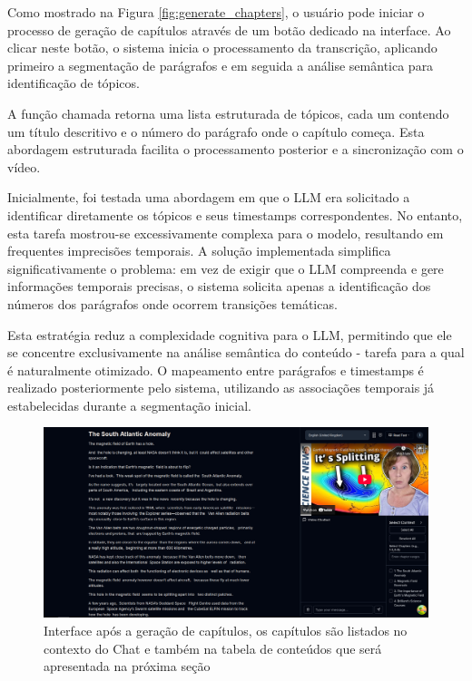 \documentclass[tcc,capa]{texufpel}
\begin{document}
Como mostrado na Figura \ref{fig:generate_chapters}, o usuário pode iniciar o processo de geração de capítulos através de um botão dedicado na interface. Ao clicar neste botão, o sistema inicia o processamento da transcrição, aplicando primeiro a segmentação de parágrafos e em seguida a análise semântica para identificação de tópicos.

A função chamada retorna uma lista estruturada de tópicos, cada um contendo um título descritivo e o número do parágrafo onde o capítulo começa. Esta abordagem estruturada facilita o processamento posterior e a sincronização com o vídeo.

Inicialmente, foi testada uma abordagem em que o LLM era solicitado a identificar diretamente os tópicos e seus timestamps correspondentes. No entanto, esta tarefa mostrou-se excessivamente complexa para o modelo, resultando em frequentes imprecisões temporais. A solução implementada simplifica significativamente o problema: em vez de exigir que o LLM compreenda e gere informações temporais precisas, o sistema solicita apenas a identificação dos números dos parágrafos onde ocorrem transições temáticas.

Esta estratégia reduz a complexidade cognitiva para o LLM, permitindo que ele se concentre exclusivamente na análise semântica do conteúdo - tarefa para a qual é naturalmente otimizado. O mapeamento entre parágrafos e timestamps é realizado posteriormente pelo sistema, utilizando as associações temporais já estabelecidas durante a segmentação inicial. 

\begin{figure}[H]
  \centering
  \includegraphics[width=\textwidth,height=0.45\textheight,keepaspectratio]{exemplo-slides/graphics/images/after-chapter-generation.png}
  \caption{Interface após a geração de capítulos, os capítulos são listados no contexto do Chat e também na tabela de conteúdos que será apresentada na próxima seção}
  \label{fig:after_chapter_generation}
\end{figure}
\end{document}
